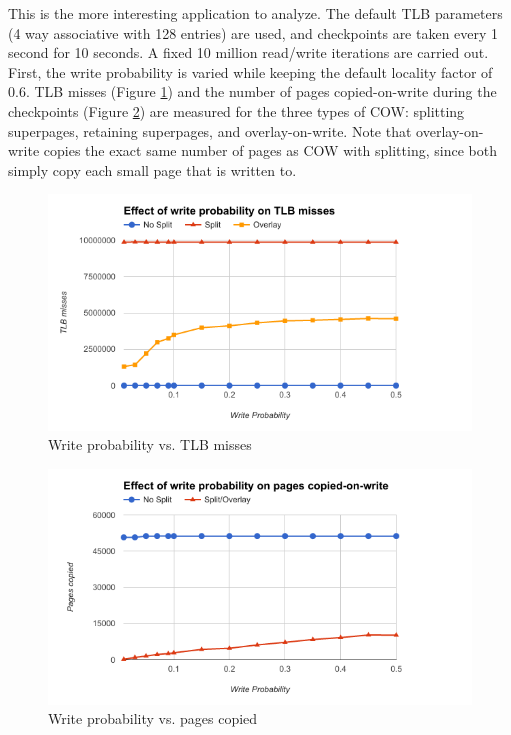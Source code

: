 This is the more interesting application to analyze. The default TLB parameters (4 way associative with 128 entries) are used, and checkpoints are taken every 1 second for 10 seconds. A fixed 10 million read/write iterations are carried out. First, the write probability is varied while keeping the default locality factor of $0.6$. TLB misses (Figure \ref{fig:write_prob_misses}) and the number of pages copied-on-write during the checkpoints (Figure \ref{fig:write_prob_copied}) are measured for the three types of COW: splitting superpages, retaining superpages, and overlay-on-write. Note that overlay-on-write copies the exact same number of pages as COW with splitting, since both simply copy each small page that is written to.
\begin{figure}
    \centering
    \includegraphics[width=6in]{Figures/write_prob_tlb}
    \caption{Write probability vs. TLB misses}
    \label{fig:write_prob_misses}
\end{figure}
\begin{figure}
    \centering
    \includegraphics[width=6in]{Figures/write_prob_copied}
    \caption{Write probability vs. pages copied}
    \label{fig:write_prob_copied}
\end{figure}

